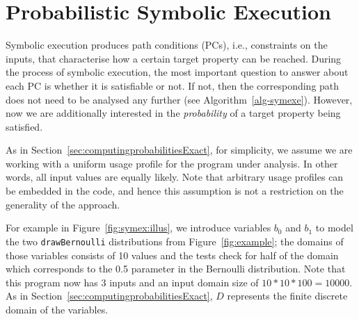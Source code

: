 \section{Probabilistic Symbolic Execution}
\label{sec:pse}

Symbolic execution produces path conditions (PCs), i.e., constraints on the inputs, that characterise how a certain target property can be reached. During the process of symbolic execution, the most important question to answer about each PC is whether it is satisfiable or not.  If not, then the corresponding path does not need to be analysed any further (see Algorithm~\ref{alg-symexe}).  However, now we are additionally interested in the \emph{probability} of a target property being satisfied. 

As in Section~\ref{sec:computingprobabilitiesExact}, for simplicity, we assume we are working with a uniform usage profile for the program under analysis.  In other words, all input values are equally likely.  Note that arbitrary usage profiles can be embedded in the code, and hence this assumption is not a restriction on the generality of the approach. 

For example in Figure~\ref{fig:symex:illus}, 
we introduce variables $b_0$ and $b_1$ to model 
the two {\tt drawBernoulli} distributions from Figure~\ref{fig:example};
the domains of those variables consists of 10 values and the tests
check for half of the domain which corresponds to the 0.5 parameter
in the Bernoulli distribution.
Note that this program now has 3 inputs and an input domain size of
$10 * 10 * 100 = 10000$.
As in Section~\ref{sec:computingprobabilitiesExact}, $D$ represents the finite discrete domain of the variables.


